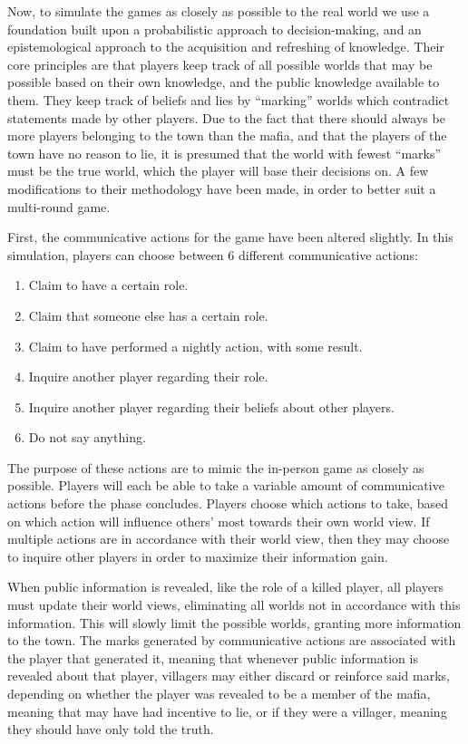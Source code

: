 Now, to simulate the games as closely as possible to the real world we use a
foundation built upon a probabilistic  approach to decision-making, and an
epistemological approach to the acquisition and refreshing of
knowledge\cite{commitment}. Their core principles are that players keep track
of all possible worlds that may be possible based on their own knowledge, and
the public knowledge available to them. They keep track of beliefs and lies by
“marking” worlds which contradict statements made by other players. Due to the
fact that there should always be more players belonging to the town than the
mafia, and that the players of the town have no reason to lie, it is presumed
that the world with fewest “marks” must be the true world, which the player
will base their decisions on. A few modifications to their methodology have
been made, in order to better suit a multi-round game.

First, the communicative actions for the game have been altered slightly. In
this simulation, players can choose between 6 different communicative actions:
\begin{enumerate}
	\item Claim to have a certain role.
	\item Claim that someone else has a certain role.
	\item Claim to have performed a nightly action, with some result.
	\item Inquire another player regarding their role.
	\item Inquire another player regarding their beliefs about other players.
	\item Do not say anything.
\end{enumerate}
The purpose of these actions are to mimic the in-person game as closely as
possible. Players will each be able to take a variable amount of communicative actions before the
phase concludes. Players choose which actions to take, based on which action
will influence others’ most towards their own world view.  If multiple actions
are in accordance with their world view, then they may choose to inquire other
players in order to maximize their information gain.

When public information is revealed, like the role of a killed player, all
players must update their world views, eliminating all worlds not in accordance
with this information. This will slowly limit the possible worlds, granting
more information to the town. The marks generated by communicative actions are
associated with the player that generated it, meaning that whenever public
information is revealed about that player, villagers may either discard or
reinforce said marks, depending on whether the player was revealed to be a
member of the mafia, meaning that may have had incentive to lie, or if they
were a villager, meaning they should have only told the truth.

